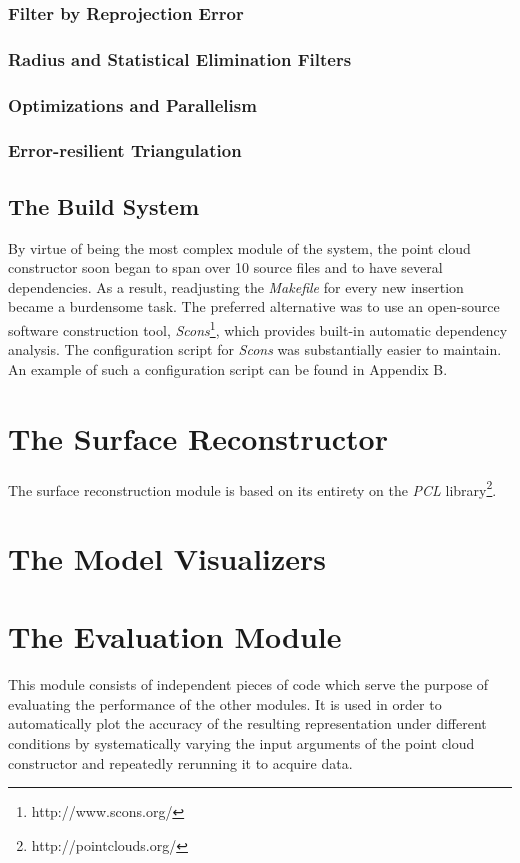 \documentclass[12pt,a4paper,twoside,openright]{report}
\begin{document}
\subsubsection{Filter by Reprojection Error}
\subsubsection{Radius and Statistical Elimination Filters}
\subsubsection{Optimizations and Parallelism}
\subsubsection{Error-resilient Triangulation}

\subsection{The Build System}
By virtue of being the most complex module of the system, the point cloud constructor soon began to span over 10 source files and to have several dependencies. As a result, readjusting the \emph{Makefile} for every new insertion became a burdensome task. The preferred alternative was to use an open-source software construction tool, \emph{Scons}\footnote{http://www.scons.org/}, which provides built-in automatic dependency analysis. The configuration script for \emph{Scons} was substantially easier to maintain. An example of such a configuration script can be found in Appendix B.

\section{The Surface Reconstructor}
The surface reconstruction module is based on its entirety on the \emph{PCL} library\footnote{http://pointclouds.org/}. 

\section{The Model Visualizers}


\section{The Evaluation Module}
This module consists of independent pieces of code which serve the purpose of evaluating the performance of the other modules. It is used in order to automatically plot the accuracy of the resulting representation under different conditions by systematically varying the input arguments of the point cloud constructor and repeatedly rerunning  it to acquire data. 
\end{document}
